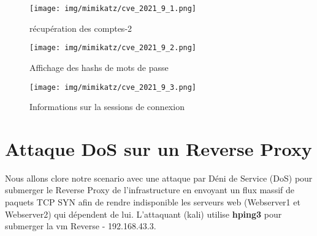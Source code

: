 \documentclass[a4paper,12pt]{report}
\begin{document}
    \begin{figure}[H] 
      \label{mimikatz-9-1}
        \centering
          \texttt{[image: img/mimikatz/cve\_2021\_9\_1.png]} 
        \caption{récupération des comptes-2}
    \end{figure}

    \begin{figure}[H] 
      \label{mimikatz-9-2}
        \centering
          \texttt{[image: img/mimikatz/cve\_2021\_9\_2.png]} 
        \caption{Affichage des hashs de mots de passe}
    \end{figure}

      \begin{figure}[H] 
      \label{mimikatz-9-3}
        \centering
          \texttt{[image: img/mimikatz/cve\_2021\_9\_3.png]} 
        \caption{Informations sur la sessions de connexion}
    \end{figure}



\section{Attaque DoS sur un Reverse Proxy}

Nous allons clore notre scenario avec une attaque par Déni de Service (DoS) pour submerger le Reverse Proxy de l'infrastructure en envoyant un flux massif de paquets TCP SYN afin de rendre indisponible les serveurs web (Webserver1 et Webserver2) qui dépendent de lui. L'attaquant (kali) utilise \textbf{hping3} pour submerger la vm Reverse - 192.168.43.3.
\end{document}
